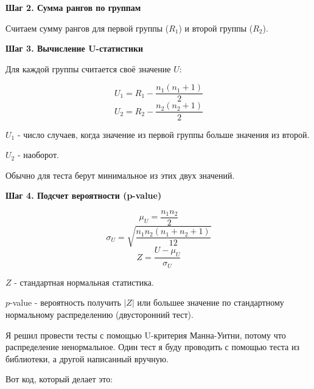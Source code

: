 \documentclass[14pt]{extreport}
\begin{document}
\textbf{Шаг 2. Сумма рангов по группам}

Считаем сумму рангов для первой группы ($R_1$) и второй группы ($R_2$).

\textbf{Шаг 3. Вычисление U-статистики}

Для каждой группы считается своё значение $U$:

\[
U_1 = R_1 - \frac{n_1(n_1+1)}{2}
\]
\[
U_2 = R_2 - \frac{n_2(n_2+1)}{2}
\]

$U_1$ - число случаев, когда значение из первой группы больше значения из второй.

$U_2$ - наоборот.


Обычно для теста берут минимальное из этих двух значений.

\textbf{Шаг 4. Подсчет вероятности (p-value)}

\[
\mu_U = \frac{n_1 n_2}{2}
\]
\[
\sigma_U = \sqrt{ \frac{n_1 n_2 (n_1 + n_2 + 1)}{12} }
\]
\[
Z = \frac{U - \mu_U}{\sigma_U}
\]

$Z$ - стандартная нормальная статистика.

$p$-value - вероятность получить $|Z|$ или большее значение по стандартному нормальному распределению (двусторонний тест).

Я решил провести тесты с помощью U-критерия Манна-Уитни, потому что распределение ненормальное. Один тест я буду проводить с помощью теста из библиотеки, а другой написанный вручную.

Вот код, который делает это:
\end{document}
